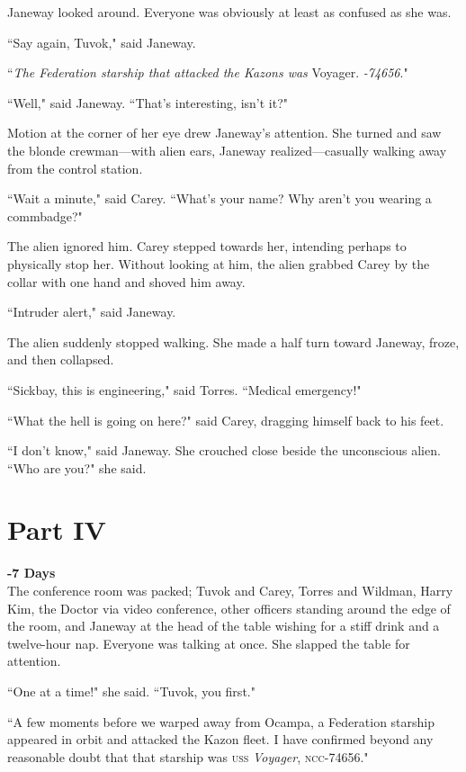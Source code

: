 \documentclass[twoside,letterpaper,12pt]{memoir}
\begin{document}
Janeway looked around. Everyone was obviously at least as confused as she was.

``Say again, Tuvok," said Janeway.

``\textit{The Federation starship that attacked the Kazons was}  Voyager. \textit{-74656}."

``Well," said Janeway. ``That's interesting, isn't it?"

Motion at the corner of her eye drew Janeway's attention. She turned and saw the blonde crewman---with alien ears, Janeway realized---casually walking away from the control station.

``Wait a minute," said Carey. ``What's your name? Why aren't you wearing a commbadge?"

The alien ignored him. Carey stepped towards her, intending perhaps to physically stop her. Without looking at him, the alien grabbed Carey by the collar with one hand and shoved him away.

``Intruder alert," said Janeway.

The alien suddenly stopped walking. She made a half turn toward Janeway, froze, and then collapsed.

``Sickbay, this is engineering," said Torres. ``Medical emergency!"

``What the hell is going on here?" said Carey, dragging himself back to his feet.

``I don't know," said Janeway. She crouched close beside the unconscious alien. ``Who are you?" she said.

\chapter*{Part IV}

\noindent\textbf{-7 Days}\\

The conference room was packed; Tuvok and Carey, Torres and Wildman, Harry Kim, the Doctor via video conference, other officers standing around the edge of the room, and Janeway at the head of the table wishing for a stiff drink and a twelve-hour nap. Everyone was talking at once. She slapped the table for attention. 

``One at a time!" she said. ``Tuvok, you first." 

``A few moments before we warped away from Ocampa, a Federation starship appeared in orbit and attacked the Kazon fleet. I have confirmed beyond any reasonable doubt that that starship was \textsc{uss} \textit{Voyager}, \textsc{ncc}-74656." 
\end{document}
